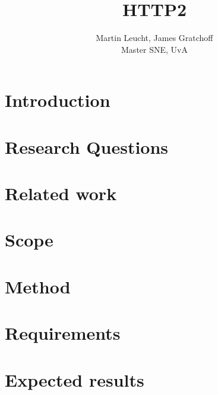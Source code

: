 \documentclass{article}
\begin{document}
 
\begin{figure}[!bh]
 	\begin{center}
		\huge \title{HTTP2}
		\author{ Martin Leucht, James Gratchoff \\
		Master SNE, UvA} 
		
	\maketitle 
		\label{sec:uva}
	\end{center}
\end{figure}
\setlength{\columnsep}{2cm}
\def\columnseprulecolor{\color{blue}}
 \newpage
\begin{multicols}{2}

\section{Introduction}

\section{Research Questions}

\section{Related work}

\section{Scope}

\section{Method}

\section{Requirements}

\section{Expected results}


\begin{thebibliography}

\end{thebibliography}
\newpage
\appendix

\end{multicols}
\end{document}
